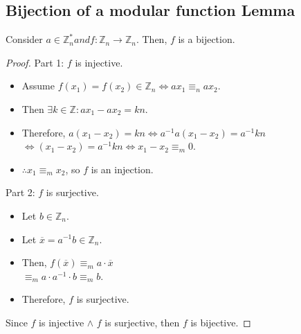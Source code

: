 \subsection{Bijection of a modular function Lemma}
\begin{lemma}\label{bijection_lemma}
    Consider $a \in \mathbb{Z}_{n}^{*} and f: \mathbb{Z}_{n} \rightarrow \mathbb{Z}_{n}$.\newline
    Then, $f$ is a bijection.\newline
\end{lemma}
\begin{proof}
    Part 1: $f$ is injective.\newline
    \begin{itemize}
        \item Assume $f(x_{1}) = f(x_{2}) \in \mathbb{Z}_{n} \iff ax_{1} \equiv_{n} ax_{2}$.
        \item Then $\exists k \in \mathbb{Z}: ax_{1} - ax_{2} = kn$.
        \item Therefore, $a(x_{1} - x_{2}) = kn \iff a^{-1}a(x_{1} - x_{2}) = a^{-1}kn$\\
        $\iff (x_{1} - x_{2}) = a^{-1}kn \iff x_{1} - x_{2} \equiv_{m} 0$.
        \item $\therefore x_{1} \equiv_{m} x_{2}$, so $f$ is an injection.
    \end{itemize}
    Part 2: $f$ is surjective.
    \begin{itemize}
        \item Let $b \in \mathbb{Z}_{n}$.
        \item Let $\overline{x} = a^{-1}b \in \mathbb{Z}_{n}$.
        \item Then, $f(\overline{x}) \equiv_{m} a \cdot \overline{x}$\\
        $\equiv_{m} a \cdot a^{-1} \cdot b \equiv_{m} b$.
        \item Therefore, $f$ is surjective.
    \end{itemize}
    Since $f$ is injective $\land$ $f$ is surjective, then $f$ is bijective.
\end{proof}

